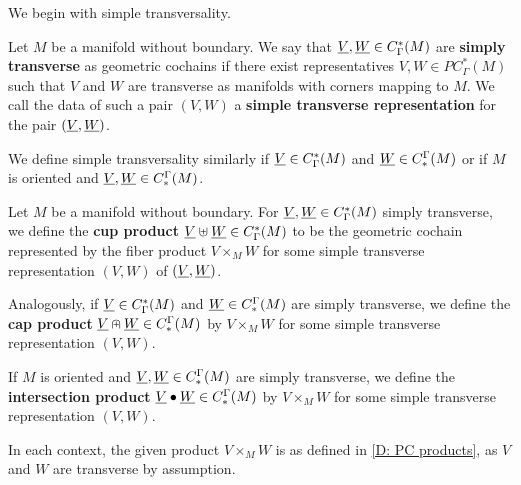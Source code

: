 We begin with simple transversality.

\begin{definition}\label{D: cochain trans}
	Let $M$ be a manifold without boundary.
	We say that $\underline{V}, \underline{W} \in C^*_{\Gamma}(M)$ are \textbf{simply transverse} as geometric cochains if there exist representatives $V,W \in PC^*_\Gamma(M)$ such that $V$ and $W$ are transverse as manifolds with corners mapping to $M$.
	We call the data of such a pair $(V,W)$ a \textbf{simple transverse representation} for the pair $(\underline{V},\underline{W})$.

	We define simple transversality similarly if $\underline{V} \in C^*_{\Gamma}(M)$ and $\underline{W} \in C_*^{\Gamma}(M)$ or if $M$ is oriented and $\underline{V}, \underline{W} \in C_*^{\Gamma}(M)$.
\end{definition}

\begin{definition}\label{D: cochain products}
	Let $M$ be a manifold without boundary.
	For $\underline{V}, \underline{W} \in C^*_{\Gamma}(M)$ simply transverse, we define the \textbf{cup product} $\underline{V} \uplus \underline{W} \in C^*_\Gamma(M)$ to be the geometric cochain represented by the fiber product $V \times_M W$ for some simple transverse representation $(V,W)$ of $(\underline{V},\underline{W})$.

	Analogously, if $\underline{V} \in C^*_{\Gamma}(M)$ and $\underline{W} \in C_*^{\Gamma}(M)$ are simply transverse, we define the \textbf{cap product} $\underline{V} \nplus \underline{W} \in C_*^\Gamma(M)$ by $V \times_M W$ for some simple transverse representation $(V,W)$.

	If $M$ is oriented and $\underline{V},\underline{W} \in C_*^\Gamma(M)$ are simply transverse, we define the \textbf{intersection product} $\underline{V} \bullet \underline{W} \in C_*^\Gamma(M)$ by $V \times_M W$ for some simple transverse representation $(V,W)$.

	In each context, the given product $V \times_M W$ is as defined in \cref{D: PC products}, as $V$ and $W$ are transverse by assumption.
\end{definition}

